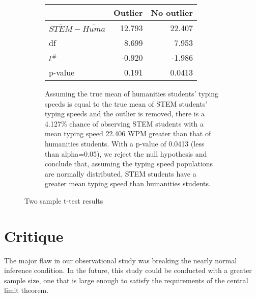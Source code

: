 \documentclass{article}
\begin{document}
\begin{figure}[ht]
    \begin{subfigure}[t]{0.4\textwidth}
        \centering
        \begin{tabular}[t]{lrr}
            \toprule
            & Outlier & No outlier \\
            \midrule
            $\overline{STEM} - \overline{Huma}$ & 12.793 & 22.407 \\
            df & 8.699  & 7.953 \\
            $t^{\#}$ & -0.920 & -1.986 \\
            p-value & 0.191 & 0.0413 \\
        \end{tabular}
    \end{subfigure}\hfill%
    \begin{subfigure}[t]{0.5\textwidth}
        Assuming the true mean of humanities students’ typing speeds is equal
        to the true mean of STEM students’ typing speeds and the outlier is
        removed, there is a 4.127\% chance of observing STEM students with a
        mean typing speed 22.406 WPM greater than that of humanities students.
        With a p-value of 0.0413 (less than alpha=0.05), we reject the null
        hypothesis and conclude that, assuming the typing speed populations are
        normally distributed, STEM students have a greater mean typing speed
        than humanities students.
    \end{subfigure}
    \caption{Two sample t-test results}
    \label{table:ttest}
\end{figure}

\section{Critique}

The major flaw in our observational study was breaking the nearly normal
inference condition. In the future, this study could be conducted with a
greater sample size, one that is large enough to satisfy the requirements of
the central limit theorem.
\end{document}
